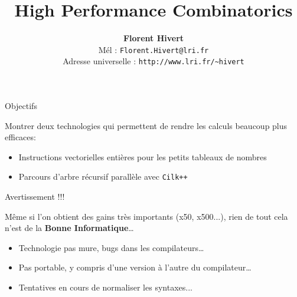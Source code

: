 \documentclass{beamer}
\title[High Performance Combinatorics]%
{\bf High Performance Combinatorics}
\author{\textbf{\Large Florent Hivert}\\[5mm]
  Mél : \texttt{Florent.Hivert@lri.fr}\\
  Adresse universelle : \texttt{http://www.lri.fr/\~{ }hivert}
}
\date{}
\def\opstyle#1{\ensuremath{\operatorname{#1}}}
\begin{document}
\newcommand{\Count}{\opstyle{count}}
\newcommand{\List}{\opstyle{list}}
\newcommand{\Iter}{\opstyle{iter}}
\newcommand{\Unrank}{\opstyle{unrank}}
\newcommand{\Rank}{\opstyle{rank}}
\newcommand{\First}{\opstyle{first}}
\newcommand{\Next}{\opstyle{next}}
\newcommand{\Random}{\opstyle{random}}

\newcommand{\Concat}{\opstyle{concat}}
\newcommand{\BS}{\opstyle{BitString}}
\newcommand{\Perm}{\opstyle{Perm}}
\newcommand{\Union}{\opstyle{Union}}
\newcommand{\Prod}{\opstyle{Prod}}

\newcommand{\Pos}{\opstyle{Pos}}
\newcommand{\Bin}{\opstyle{Bin}}
\newcommand{\Gray}{\opstyle{Gray}}

\newcommand{\mA}{\mathcal{A}}
\newcommand{\mB}{\mathcal{B}}
\newcommand{\mC}{\mathcal{C}}
\newcommand{\mD}{\mathcal{D}}
\newcommand{\mE}{\mathcal{E}}
\newcommand{\mI}{\mathcal{I}}
\newcommand{\mZ}{\mathcal{Z}}

\newcommand{\Oh}{O}

\frame{\titlepage}

\begin{frame}{Objectifs}
\Large

Montrer deux technologies qui permettent de rendre les calculs beaucoup plus
efficaces:\pause
\begin{itemize}
\item Instructions vectorielles entières pour les petits tableaux de nombres
\bigskip\pause

\item Parcours d'arbre récursif parallèle avec \texttt{Cilk++}
\end{itemize}
\end{frame}


\begin{frame}{Avertissement !!!}

Même si l'on obtient des gains très importants (x50, x500...), rien de tout
cela n'est de la \textbf{Bonne Informatique}\dots
\begin{itemize}
\item Technologie pas mure, bugs dans les compilateurs\dots
\bigskip\pause

\item Pas portable, y compris d'une version à l'autre du compilateur\dots
\bigskip\pause

\item Tentatives en cours de normaliser les syntaxes...
\end{itemize}
\end{frame}
\end{document}
